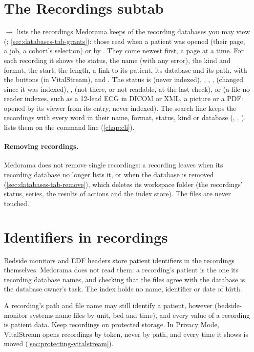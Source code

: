 \section{The Recordings subtab}
\label{sec:recordings-tab}

 $\rightarrow$  lists the recordings Medorama keeps of the
recording databases you may view (; \cref{sec:databases-tab-grants}): those read when
a patient was opened (their page, a job, a cohort's selection) or by .
They come newest first, a page at a time. For each
recording it shows the status, the name (with any error), the kind and format, the start, the
length, a link to its patient, its database and its path, with the buttons  (in
VitalStream),  and . The status is  (never indexed),
, , ,  (changed since it was indexed),
,  (not there, or not readable, at the last check), or  (a
file no reader indexes, such as a 12-lead ECG in DICOM or XML, a picture or a PDF: opened by its
viewer from its entry, never indexed). The search line
keeps the recordings with every word in their name, format, status, kind or database
(, , ).  lists them on the command
line (\cref{chap:cli}).

\paragraph{Removing recordings.} Medorama does not remove single recordings: a recording leaves
when its recording database no longer lists it, or when the database is removed
(\cref{sec:databases-tab-remove}), which deletes its workspace folder (the recordings' status,
series, the results of actions and the index store). The files are
never touched.

\section{Identifiers in recordings}
\label{sec:recordings-identifiers}

\begin{phibox}
Bedside monitors and EDF headers store patient identifiers in the recordings themselves. Medorama
does not read them: a recording's patient is the one its recording database names, and checking
that the files agree with the database is the database owner's task. The index holds no name,
identifier or date of birth.

A recording's path and file name may still identify a patient, however (bedside-monitor systems
name files by unit, bed and time), and every value of a recording is patient data. Keep
recordings on protected storage. In Privacy Mode,
VitalStream opens recordings by token, never by path, and every time it shows is moved
(\cref{sec:protecting-vitalstream}).
\end{phibox}
